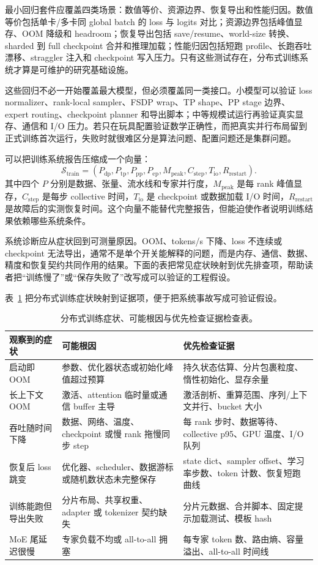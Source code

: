 \documentclass[UTF8,zihao=-4,openany]{ctexbook}
\begin{document}
最小回归套件应覆盖四类场景：数值等价、资源边界、恢复导出和性能归因。数值等价包括单卡/多卡同 global batch 的 loss 与 logits 对比；资源边界包括峰值显存、OOM 降级和 headroom；恢复导出包括 save/resume、world-size 转换、sharded 到 full checkpoint 合并和推理加载；性能归因包括短跑 profile、长跑吞吐漂移、straggler 注入和 checkpoint 写入压力。只有这些测试存在，分布式训练系统才算是可维护的研究基础设施。

这些回归不必一开始覆盖最大模型，但必须覆盖同一类接口。小模型可以验证 loss normalizer、rank-local sampler、FSDP wrap、TP shape、PP stage 边界、expert routing、checkpoint planner 和导出脚本；中等规模试运行再验证真实显存、通信和 I/O 压力。若只在玩具配置验证数学正确性，而把真实并行布局留到正式训练首次运行，失败时就很难区分是算法问题、配置问题还是集群问题。

可以把训练系统报告压缩成一个向量：
\[
  \mathcal{S}_{\mathrm{train}}
  =
  (P_{\mathrm{dp}},P_{\mathrm{tp}},P_{\mathrm{pp}},P_{\mathrm{ep}},
  M_{\mathrm{peak}},C_{\mathrm{step}},T_{\mathrm{io}},R_{\mathrm{restart}}).
\]
其中四个 $P$ 分别是数据、张量、流水线和专家并行度，$M_{\mathrm{peak}}$ 是每 rank 峰值显存，$C_{\mathrm{step}}$ 是每步 collective 时间，$T_{\mathrm{io}}$ 是 checkpoint 或数据加载 I/O 时间，$R_{\mathrm{restart}}$ 是故障后的实测恢复时间。这个向量不能替代完整报告，但能迫使作者说明训练结果依赖哪些系统条件。

系统诊断应从症状回到可测量原因。OOM、tokens/s 下降、loss 不连续或 checkpoint 无法导出，通常不是单个开关能解释的问题，而是内存、通信、数据、精度和恢复契约共同作用的结果。下面的表把常见症状映射到优先排查项，帮助读者把“训练慢了”或“保存失败了”改写成可以验证的工程假设。

表~\ref{tab:zh-distributed-diagnostics} 把分布式训练症状映射到证据项，便于把系统事故写成可验证假设。

\begin{table}[t]
\centering
\small
\begin{tabular}{@{}p{}p{}p{}@{}}
\toprule
观察到的症状 & 可能根因 & 优先检查证据 \\
\midrule
启动即 OOM & 参数、优化器状态或初始化峰值超过预算 & 持久状态估算、分片包裹粒度、惰性初始化、显存余量 \\
长上下文 OOM & 激活、attention 临时量或通信 buffer 主导 & 激活剖析、重算范围、序列/上下文并行、bucket 大小 \\
吞吐随时间下降 & 数据、网络、温度、checkpoint 或慢 rank 拖慢同步 step & 每 rank 步时、数据等待、collective p95、GPU 温度、I/O 队列 \\
恢复后 loss 跳变 & 优化器、scheduler、数据游标或随机数状态未完整保存 & state dict、sampler offset、学习率步数、token 计数、恢复短跑曲线 \\
训练能跑但导出失败 & 分片布局、共享权重、adapter 或 tokenizer 契约缺失 & 分片元数据、合并脚本、固定提示加载测试、模板 hash \\
MoE 尾延迟很慢 & 专家负载不均或 all-to-all 拥塞 & 每专家 token 数、路由熵、容量溢出、all-to-all 时间线 \\
\bottomrule
\end{tabular}
\caption{分布式训练症状、可能根因与优先检查证据检查表。}
\label{tab:zh-distributed-diagnostics}
\end{table}
\end{document}
